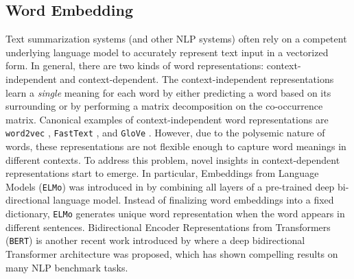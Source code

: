 \subsection{Word Embedding}

Text summarization systems (and other NLP systems) often rely on a competent underlying language model to accurately represent text input in a vectorized form. In general, there are two kinds of word representations: context-independent and context-dependent. The context-independent representations learn a \textit{single} meaning for each word by either predicting a word based on its surrounding or by performing a matrix decomposition on the co-occurrence matrix. Canonical examples of context-independent word representations are \texttt{word2vec} \cite{mikolov2013efficient}, \texttt{FastText} \cite{bojanowski2017enriching}, and \texttt{GloVe} \cite{pennington2014glove}. However, due to the polysemic nature of words, these representations are not flexible enough to capture word meanings in different contexts. To address this problem, novel insights in context-dependent representations start to emerge. In particular, Embeddings from Language Models (\texttt{ELMo}) was introduced in \cite{peters2018deep} by combining all layers of a pre-trained deep bi-directional language model. Instead of finalizing word embeddings into a fixed dictionary, \texttt{ELMo} generates unique word representation when the word appears in different sentences. Bidirectional Encoder Representations from Transformers (\texttt{BERT}) is another recent work introduced by \cite{devlin2018bert} where a deep bidirectional Transformer architecture was proposed, which has shown compelling results on many NLP benchmark tasks.  

